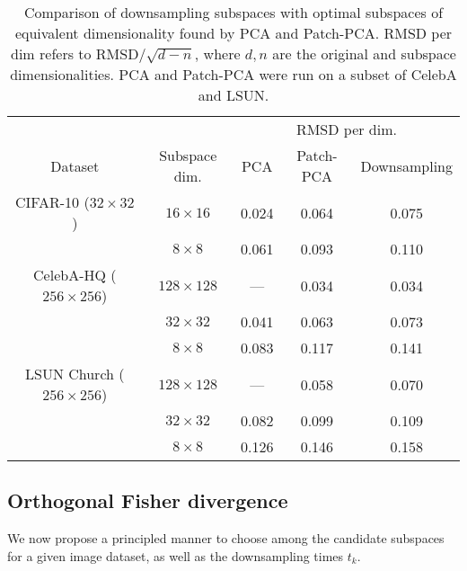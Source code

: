 \documentclass{article}
\begin{document}
\begin{table}[t!]
    \centering
    \begin{tabular}{ccccc}  
    \toprule
    & & \multicolumn{3}{c}{RMSD per dim.}\\ \cmidrule{3-5}
    Dataset  & Subspace dim. & PCA & Patch-PCA & Downsampling \\ \midrule
    \multirowcell{2}{CIFAR-10 \\ ($32\times 32$)}   
    & $16\times 16$ & 0.024 & 0.064 & 0.075\\
    & $8 \times 8$  & 0.061 & 0.093 & 0.110\\    \midrule
    \multirowcell{3}{CelebA-HQ \\ ($256\times 256$)}
    & $128\times 128$ & --- & 0.034 & 0.034\\
    & $32 \times 32$  & 0.041 & 0.063 & 0.073\\
    & $8 \times 8$  & 0.083 & 0.117 & 0.141\\ 
    \midrule
    \multirowcell{3}{LSUN Church \\ ($256\times 256$)}
    & $128\times 128$ & --- & 0.058 & 0.070\\
    & $32 \times 32$  & 0.082 & 0.099 & 0.109\\ 
    & $8 \times 8$  & 0.126 & 0.146 & 0.158\\ 
    \bottomrule
    \end{tabular}
    \caption{Comparison of downsampling subspaces with optimal subspaces of equivalent dimensionality found by PCA and Patch-PCA. RMSD per dim refers to RMSD$/\sqrt{d-n}$, where $d, n$ are the original and subspace dimensionalities. PCA and Patch-PCA were run on a subset of CelebA and LSUN.}
    \label{tab:pca}
\end{table}

\subsection{Orthogonal Fisher divergence} \label{sec:fisher}

We now propose a principled manner to choose among the candidate subspaces for a given image dataset, as well as the downsampling times $t_k$.
\end{document}
